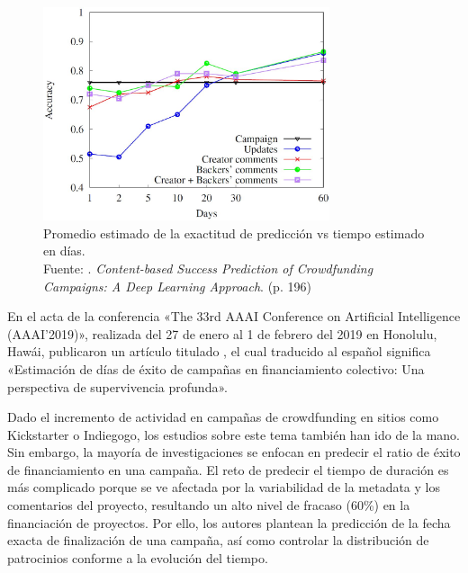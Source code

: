 \begin{figure}[!ht]
	\begin{center}
		\includegraphics[width=0.75\textwidth]{2/figures/lee2018.jpg}
		\caption[Promedio estimado de la exactitud de predicción vs tiempo estimado en días]{Promedio estimado de la exactitud de predicción vs tiempo estimado en días.\\
		Fuente: \cite{pr_lee2018contentDL}. \textit{Content-based Success Prediction of Crowdfunding
			Campaigns: A Deep Learning Approach}. (p. 196)}
		\label{2:fig123}
	\end{center}
\end{figure}

\newpage
En el acta de la conferencia «The 33rd AAAI Conference on Artificial Intelligence (AAAI'2019)», realizada del 27 de enero al 1 de febrero del 2019 en Honolulu, Hawái, \cite{pr_jin2019dayssuccess} publicaron un artículo titulado , el cual traducido al español significa «Estimación de días de éxito de campañas en financiamiento colectivo: Una perspectiva de supervivencia profunda».

Dado el incremento de actividad en campañas de crowdfunding en sitios como Kickstarter o Indiegogo, los estudios sobre este tema también han ido de la mano. Sin embargo, la mayoría de investigaciones se enfocan en predecir el ratio de éxito de financiamiento en una campaña. El reto de predecir el tiempo de duración es más complicado porque se ve afectada por la variabilidad de la metadata y los comentarios del proyecto, resultando un alto nivel de fracaso (60\%) en la financiación de proyectos. Por ello, los autores plantean la predicción de la fecha exacta de finalización de una campaña, así como controlar la distribución de patrocinios conforme a la evolución del tiempo.

